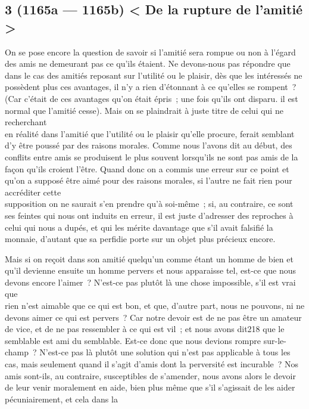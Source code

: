 \documentclass[french,twoside]{book} %
\begin{document}
\subsection[{3 (1165a — 1165b) < De la rupture de l’amitié >}]{3 (1165a — 1165b) < De la rupture de l’amitié >}
\noindent On se pose encore la question de savoir si l’amitié sera  rompue ou non à l’égard des amis ne demeurant pas ce qu’ils étaient. Ne devons-nous pas répondre que dans le cas des amitiés reposant sur l’utilité ou le plaisir, dès que les intéressés ne possèdent plus ces avantages, il n’y a rien d’étonnant à ce qu’elles se rompent ? (Car c’était de ces avantages qu’on était épris ; une fois qu’ils ont disparu. il est normal que l’amitié cesse). Mais on se plaindrait à juste titre de celui qui ne recherchant \\
en réalité dans l’amitié que l’utilité ou le plaisir qu’elle procure, ferait semblant d’y être poussé par des raisons morales. Comme nous l’avons dit au début, des conflits entre amis se produisent le plus souvent lorsqu’ils ne sont pas amis de la façon qu’ils croient l’être. Quand donc on a commis une erreur sur ce point et qu’on a supposé être aimé pour des raisons morales, si l’autre ne fait rien pour accréditer cette \\
supposition on ne saurait s’en prendre qu’à soi-même ; si, au contraire, ce sont ses feintes qui nous ont induits en erreur, il est juste d’adresser des reproches à celui qui nous a dupés, et qui les mérite davantage que s’il avait falsifié la monnaie, d’autant que sa perfidie porte sur un objet plus précieux encore.\par
Mais si on reçoit dans son amitié quelqu’un comme étant un homme de bien et qu’il devienne ensuite un homme pervers et nous apparaisse tel, est-ce que nous devons encore l’aimer ? N’est-ce pas plutôt là une chose impossible, s’il est vrai que \\
rien n’est aimable que ce qui est bon, et que, d’autre part, nous ne pouvons, ni ne devons aimer ce qui est pervers ? Car notre devoir est de ne pas être un amateur de vice, et de ne pas ressembler à ce qui est vil ; et nous avons dit218 que le semblable est ami du semblable. Est-ce donc que nous devions rompre sur-le-champ ? N’est-ce pas là plutôt une solution qui n’est pas applicable à tous les cas, mais seulement quand il s’agit d’amis dont la perversité est incurable ? Nos amis sont-ils, au contraire, susceptibles de s’amender, nous avons alors le devoir de leur venir moralement en aide, bien plus même que s’il s’agissait de les aider pécuniairement, et cela dans la \\
\end{document}
